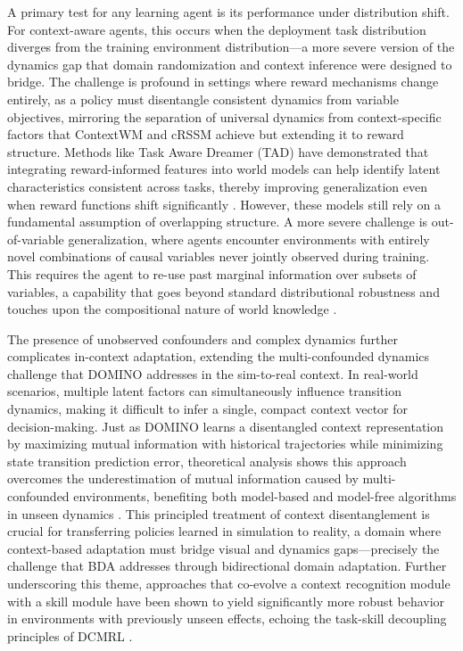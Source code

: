 \documentclass[11pt]{article}
\begin{document}
A primary test for any learning agent is its performance under distribution shift. For context-aware agents, this occurs when the deployment task distribution diverges from the training environment distribution---a more severe version of the dynamics gap that domain randomization and context inference were designed to bridge. The challenge is profound in settings where reward mechanisms change entirely, as a policy must disentangle consistent dynamics from variable objectives, mirroring the separation of universal dynamics from context-specific factors that ContextWM and cRSSM achieve but extending it to reward structure. Methods like Task Aware Dreamer (TAD) have demonstrated that integrating reward-informed features into world models can help identify latent characteristics consistent across tasks, thereby improving generalization even when reward functions shift significantly \cite{ref410}. However, these models still rely on a fundamental assumption of overlapping structure. A more severe challenge is out-of-variable generalization, where agents encounter environments with entirely novel combinations of causal variables never jointly observed during training. This requires the agent to re-use past marginal information over subsets of variables, a capability that goes beyond standard distributional robustness and touches upon the compositional nature of world knowledge \cite{ref411}.

The presence of unobserved confounders and complex dynamics further complicates in-context adaptation, extending the multi-confounded dynamics challenge that DOMINO addresses in the sim-to-real context. In real-world scenarios, multiple latent factors can simultaneously influence transition dynamics, making it difficult to infer a single, compact context vector for decision-making. Just as DOMINO learns a disentangled context representation by maximizing mutual information with historical trajectories while minimizing state transition prediction error, theoretical analysis shows this approach overcomes the underestimation of mutual information caused by multi-confounded environments, benefiting both model-based and model-free algorithms in unseen dynamics \cite{ref312}. This principled treatment of context disentanglement is crucial for transferring policies learned in simulation to reality, a domain where context-based adaptation must bridge visual and dynamics gaps---precisely the challenge that BDA addresses through bidirectional domain adaptation. Further underscoring this theme, approaches that co-evolve a context recognition module with a skill module have been shown to yield significantly more robust behavior in environments with previously unseen effects, echoing the task-skill decoupling principles of DCMRL \cite{ref412}.
\end{document}
